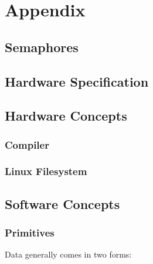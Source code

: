 \chapter{Appendix}

\section{Semaphores}\label{ref:app:semaphores}
\citep{downey_little_2005}

\section{Hardware Specification}\label{ref:app:hwspec}

\section{Hardware Concepts}
\subsection{Compiler}\label{ref:app:compiler}
\subsection{Linux Filesystem}\label{ref:app:linuxfs}



\section{Software Concepts}
\subsection{Primitives}\label{ref:app:primitives}

Data generally comes in two forms:

